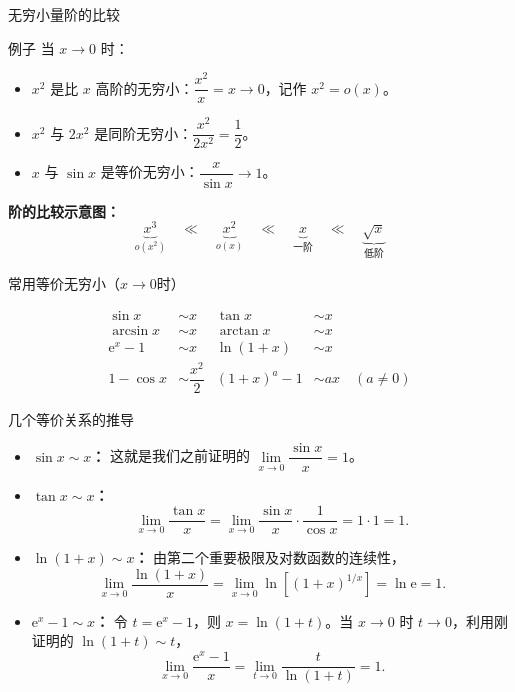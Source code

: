 \documentclass[aspectratio=169,10pt]{ctexbeamer}
\newcommand{\ee}{\mathrm{e}}
\begin{document}
\begin{frame}{无穷小量阶的比较}
	\begin{block}{例子}
		当 \(x \to 0\) 时：
		\begin{itemize}
			\item \(x^2\) 是比 \(x\) 高阶的无穷小：\(\dfrac{x^2}{x} = x \to 0\)，记作 \(x^2 = o(x)\)。
			\item \(x^2\) 与 \(2x^2\) 是同阶无穷小：\(\dfrac{x^2}{2x^2} = \dfrac{1}{2}\)。
			\item \(x\) 与 \(\sin x\) 是等价无穷小：\(\dfrac{x}{\sin x} \to 1\)。
		\end{itemize}
	\end{block}
	
	\vspace{0.5cm}
	
	\textbf{阶的比较示意图：}
	\[
	\underbrace{x^3}_{o(x^2)} \quad \ll \quad \underbrace{x^2}_{o(x)} \quad \ll \quad \underbrace{x}_{\text{一阶}} \quad \ll \quad \underbrace{\sqrt{x}}_{\text{低阶}}
	\]
	
\end{frame}

\begin{frame}{常用等价无穷小（$ x \to 0$时）}
	\large
	
	\begin{block}{ }
		\[
		\begin{aligned}
			\sin x &\sim x & \tan x &\sim x \\
			\arcsin x &\sim x & \arctan x &\sim x \\
			\ee^x - 1 &\sim x & \ln(1+x) &\sim x \\
			1 - \cos x &\sim \dfrac{x^2}{2} & (1+x)^a - 1 &\sim ax \quad (a \neq 0)
		\end{aligned}
		\]
		
	\end{block}
	

	
	
\end{frame}


\begin{frame}{几个等价关系的推导}
	
	\begin{itemize}
		\item \textbf{\(\sin x \sim x\)：} 这就是我们之前证明的 \(\lim\limits_{x \to 0} \dfrac{\sin x}{x} = 1\)。
		
		\item \textbf{\(\tan x \sim x\)：} 
		\[
		\lim\limits_{x \to 0} \dfrac{\tan x}{x} = \lim\limits_{x \to 0} \dfrac{\sin x}{x} \cdot \dfrac{1}{\cos x} = 1 \cdot 1 = 1.
		\]
		
		\item \textbf{\(\ln(1+x)\sim x\)：} 由第二个重要极限及对数函数的连续性，
		\[
		\lim\limits_{x\to0}\frac{\ln(1+x)}{x}
		=\lim\limits_{x\to0}\ln\!\left[(1+x)^{1/x}\right]
		=\ln\ee=1.
		\]
		
		\item \textbf{\(\ee^x-1\sim x\)：} 令 \(t=\ee^x-1\)，则 \(x=\ln(1+t)\)。当 \(x\to0\) 时 \(t\to0\)，利用刚证明的 \(\ln(1+t)\sim t\)，
		\[
		\lim\limits_{x\to0}\frac{\ee^x-1}{x}
		=\lim\limits_{t\to0}\frac{t}{\ln(1+t)}=1.
		\]
	\end{itemize}
\end{frame}
\end{document}
